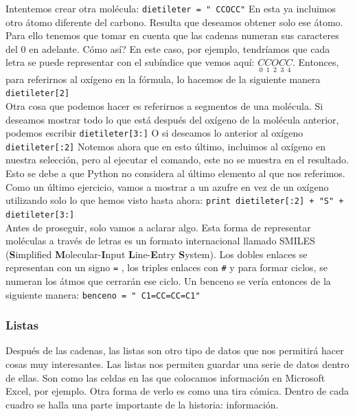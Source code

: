 \documentclass[10pt,letterpaper]{article}
\newcommand{\inlinecode}[1]{
\colorbox{light-gray}{\texttt{#1}}
}
\begin{document}
Intentemos crear otra mol\'ecula: \inlinecode{dietileter = "\ \hspace{-2mm}CCOCC"} En esta ya incluimos otro \'atomo diferente del carbono. Resulta que deseamos obtener solo ese \'atomo. Para ello tenemos que tomar en cuenta que las cadenas numeran sus caracteres del 0 en adelante. C\'omo as\'i? En este caso, por ejemplo, tendr\'iamos que cada letra se puede representar con el sub\'indice que vemos aqu\'i: $\underset{0}{C} \underset{1}{C} \underset{2}{O} \underset{3}{C} \underset{4}{C}$. Entonces, para referirnos al ox\'igeno en la f\'ormula, lo hacemos de la siguiente manera \inlinecode{dietileter[2]}\\

Otra cosa que podemos hacer es referirnos a segmentos de una mol\'ecula. Si deseamos mostrar todo lo que est\'a despu\'es del ox\'igeno de la mol\'ecula anterior, podemos escribir \inlinecode{dietileter[3:]} O si deseamos lo anterior al ox\'igeno \inlinecode{dietileter[:2]} Notemos ahora que en esto \'ultimo, incluimos al ox\'igeno en nuestra selecci\'on, pero al ejecutar el comando, este no se muestra en el resultado. Esto se debe a que Python no considera al \'ultimo elemento al que nos referimos. Como un \'ultimo ejercicio, vamos a mostrar a un azufre en vez de un ox\'igeno utilizando solo lo que hemos visto hasta ahora: \inlinecode{print dietileter[:2] + "S"\ + dietileter[3:]}\\

Antes de proseguir, solo vamos a aclarar algo. Esta forma de representar mol\'eculas a trav\'es de letras es un formato internacional llamado SMILES (\textbf{S}implified \textbf{M}olecular-\textbf{I}nput \textbf{L}ine-\textbf{E}ntry \textbf{S}ystem). Los dobles enlaces se representan con un signo \inlinecode{=}, los triples enlaces con \inlinecode{\#} y para formar ciclos, se numeran los \'atmos que cerrar\'an ese ciclo. Un benceno se ver\'ia entonces de la siguiente manera: \inlinecode{benceno = "\ \hspace{-2mm}C1=CC=CC=C1"}

\subsubsection{Listas}
Despu\'es de las cadenas, las listas son otro tipo de datos que nos permitir\'a hacer cosas muy interesantes. Las listas nos permiten guardar una serie de datos dentro de ellas. Son como las celdas en las que colocamos informaci\'on en Microsoft Excel, por ejemplo. Otra forma de verlo es como una tira c\'omica. Dentro de cada cuadro se halla una parte importante de la historia: informaci\'on.\\
\end{document}
